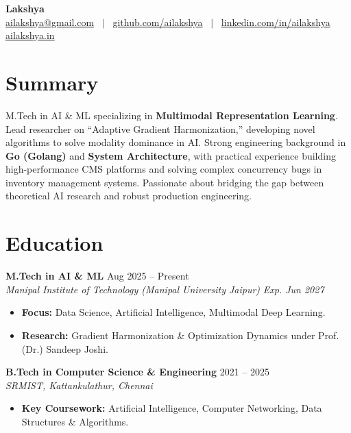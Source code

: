 \documentclass[a4paper,10pt]{article}
\newcommand{\entry}[4]{
  \noindent\textbf{#1} \hfill #2 \\
  \textit{#3} \hfill \textit{#4}
}
\begin{document}
\pagestyle{empty}

\begin{center}
    {\Huge\textbf{Lakshya}} \\ \vspace{5pt}
    \small
    \href{mailto:ailakshya@university.edu}{ailakshya@gmail.com} \ $|$ \ 
    \href{https://github.com/ailakshya}{github.com/ailakshya} \ $|$ \ 
    \href{https://linkedin.com/in/ailakshya}{linkedin.com/in/ailakshya} \\ \vspace{2pt}
    \href{https://ailakshya.in}{ailakshya.in}
\end{center}

\vspace{5pt}

\section{Summary}
M.Tech in AI \& ML  specializing in \textbf{Multimodal Representation Learning}. Lead researcher on ``Adaptive Gradient Harmonization,'' developing novel algorithms to solve modality dominance in AI. Strong engineering background in \textbf{Go (Golang)} and \textbf{System Architecture}, with practical experience building high-performance CMS platforms and solving complex concurrency bugs in inventory management systems. Passionate about bridging the gap between theoretical AI research and robust production engineering.

\section{Education}

\entry{M.Tech in AI \& ML}{Aug 2025 -- Present}
{Manipal Institute of Technology (Manipal University Jaipur)}{Exp. Jun 2027}
\begin{itemize}[noitemsep,topsep=0pt,leftmargin=15pt]
    \item \textbf{Focus:} Data Science, Artificial Intelligence, Multimodal Deep Learning.
    \item \textbf{Research:} Gradient Harmonization \& Optimization Dynamics under Prof. (Dr.) Sandeep Joshi.
\end{itemize}

\vspace{5pt}

\entry{B.Tech in Computer Science \& Engineering}{2021 -- 2025}
{SRMIST, Kattankulathur, Chennai}{}
\begin{itemize}[noitemsep,topsep=0pt,leftmargin=15pt]
    \item \textbf{Key Coursework:} Artificial Intelligence, Computer Networking, Data Structures \& Algorithms.
\end{itemize}
\end{document}
